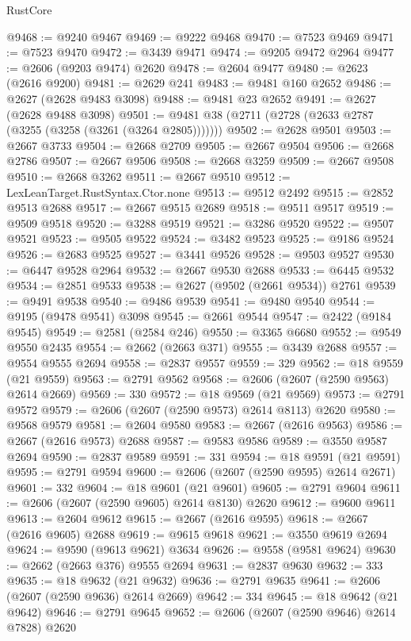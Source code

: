 \begin{lexlean}{RustCore}
\begin{coremodule}
@9468 := @9240 @9467
@9469 := @9222 @9468
@9470 := @7523 @9469
@9471 := @7523 @9470
@9472 := @3439 @9471
@9474 := @9205 @9472 @2964
@9477 := @2606 (@9203 @9474) @2620
@9478 := @2604 @9477
@9480 := @2623 (@2616 @9200)
@9481 := @2629 @241
@9483 := @9481 @160 @2652
@9486 := @2627 (@2628 @9483 @3098)
@9488 := @9481 @23 @2652
@9491 := @2627 (@2628 @9488 @3098)
@9501 := @9481 @38 (@2711 (@2728 (@2633 @2787 (@3255 (@3258 (@3261 (@3264 @2805)))))))
@9502 := @2628 @9501
@9503 := @2667 @3733
@9504 := @2668 @2709
@9505 := @2667 @9504
@9506 := @2668 @2786
@9507 := @2667 @9506
@9508 := @2668 @3259
@9509 := @2667 @9508
@9510 := @2668 @3262
@9511 := @2667 @9510
@9512 := LexLeanTarget.RustSyntax.Ctor.none
@9513 := @9512 @2492
@9515 := @2852 @9513 @2688
@9517 := @2667 @9515 @2689
@9518 := @9511 @9517
@9519 := @9509 @9518
@9520 := @3288 @9519
@9521 := @3286 @9520
@9522 := @9507 @9521
@9523 := @9505 @9522
@9524 := @3482 @9523
@9525 := @9186 @9524
@9526 := @2683 @9525
@9527 := @3441 @9526
@9528 := @9503 @9527
@9530 := @6447 @9528 @2964
@9532 := @2667 @9530 @2688
@9533 := @6445 @9532
@9534 := @2851 @9533
@9538 := @2627 (@9502 (@2661 @9534)) @2761
@9539 := @9491 @9538
@9540 := @9486 @9539
@9541 := @9480 @9540
@9544 := @9195 (@9478 @9541) @3098
@9545 := @2661 @9544
@9547 := @2422 (@9184 @9545)
@9549 := @2581 (@2584 @246)
@9550 := @3365 @6680
@9552 := @9549 @9550 @2435
@9554 := @2662 (@2663 @371)
@9555 := @3439 @2688
@9557 := @9554 @9555 @2694
@9558 := @2837 @9557
@9559 := 329
@9562 := @18 @9559 (@21 @9559)
@9563 := @2791 @9562
@9568 := @2606 (@2607 (@2590 @9563) @2614 @2669)
@9569 := 330
@9572 := @18 @9569 (@21 @9569)
@9573 := @2791 @9572
@9579 := @2606 (@2607 (@2590 @9573) @2614 @8113) @2620
@9580 := @9568 @9579
@9581 := @2604 @9580
@9583 := @2667 (@2616 @9563)
@9586 := @2667 (@2616 @9573) @2688
@9587 := @9583 @9586
@9589 := @3550 @9587 @2694
@9590 := @2837 @9589
@9591 := 331
@9594 := @18 @9591 (@21 @9591)
@9595 := @2791 @9594
@9600 := @2606 (@2607 (@2590 @9595) @2614 @2671)
@9601 := 332
@9604 := @18 @9601 (@21 @9601)
@9605 := @2791 @9604
@9611 := @2606 (@2607 (@2590 @9605) @2614 @8130) @2620
@9612 := @9600 @9611
@9613 := @2604 @9612
@9615 := @2667 (@2616 @9595)
@9618 := @2667 (@2616 @9605) @2688
@9619 := @9615 @9618
@9621 := @3550 @9619 @2694
@9624 := @9590 (@9613 @9621) @3634
@9626 := @9558 (@9581 @9624)
@9630 := @2662 (@2663 @376) @9555 @2694
@9631 := @2837 @9630
@9632 := 333
@9635 := @18 @9632 (@21 @9632)
@9636 := @2791 @9635
@9641 := @2606 (@2607 (@2590 @9636) @2614 @2669)
@9642 := 334
@9645 := @18 @9642 (@21 @9642)
@9646 := @2791 @9645
@9652 := @2606 (@2607 (@2590 @9646) @2614 @7828) @2620

\end{coremodule}
\end{lexlean}
